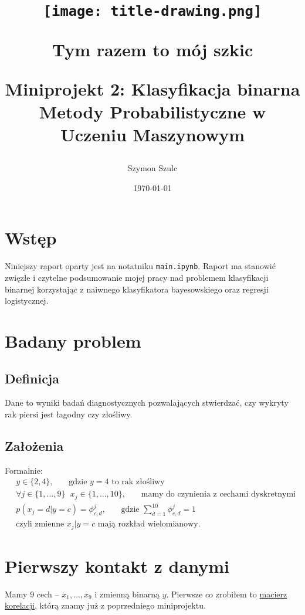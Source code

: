 \documentclass[a4paper,12pt]{article}
\title{
    \vspace{2cm} %
    \begin{figure}[h!]
        \centering
        \texttt{[image: title-drawing.png]} 
        \caption{Tym razem to mój szkic}
    \end{figure}
    \vspace{1cm} %
    \textbf{\Huge Miniprojekt 2: Klasyfikacja binarna} \\
    \vspace{1cm} %
    \large Metody Probabilistyczne w Uczeniu Maszynowym \\
    \vspace{0.5cm} %
    \large \date{\today}
}
\author{Szymon Szulc}
\begin{document}
\maketitle
\thispagestyle{empty}
\newpage

\setcounter{page}{1}  %
\tableofcontents
\newpage

\section{Wstęp}
Niniejszy raport oparty jest na notatniku \texttt{main.ipynb}. Raport ma stanowić zwięzłe i czytelne podsumowanie mojej pracy nad problemem klasyfikacji binarnej korzystając z naiwnego klasyfikatora bayesowskiego oraz regresji logistycznej.

\section{Badany problem}
\subsection{Definicja}
Dane to wyniki badań diagnostycznych pozwalających stwierdzać, czy wykryty rak piersi jest łagodny czy złośliwy. 
\subsection{Założenia}
Formalnie:
\begin{align*}
    &y \in \{2, 4\}, \hspace{22pt} \text{gdzie } y = 4 \text{ to rak złośliwy} \\
    &\forall j \in \{1,\dots,9\} \hspace{7pt} x_j \in \{1,\dots,10\}, \hspace{22pt} \text{mamy do czynienia z cechami dyskretnymi} \\
    &p(x_j = d | y = c) = \phi_{c,d}^j, \hspace{22pt} \text{gdzie } \sum_{d=1}^{10}{\phi_{c,d}^j} = 1 \\
    &\text{czyli zmienne } x_j|y=c \text{ mają rozkład wielomianowy}.
\end{align*}

\section{Pierwszy kontakt z danymi}
Mamy 9 cech -- $x_1,\dots, x_9$ i zmienną binarną $y$. Pierwsze co zrobiłem to \hyperref[fig:corr]{macierz korelacji}, którą znamy już z poprzedniego miniprojektu.
\end{document}
